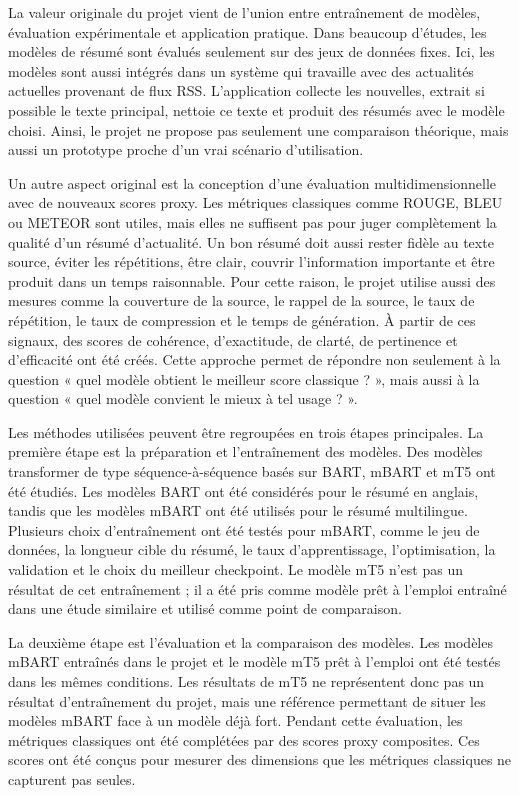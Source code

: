 La valeur originale du projet vient de l’union entre entraînement de modèles, évaluation expérimentale et application pratique. Dans beaucoup d’études, les modèles de résumé sont évalués seulement sur des jeux de données fixes. Ici, les modèles sont aussi intégrés dans un système qui travaille avec des actualités actuelles provenant de flux RSS. L’application collecte les nouvelles, extrait si possible le texte principal, nettoie ce texte et produit des résumés avec le modèle choisi. Ainsi, le projet ne propose pas seulement une comparaison théorique, mais aussi un prototype proche d’un vrai scénario d’utilisation.

Un autre aspect original est la conception d’une évaluation multidimensionnelle avec de nouveaux scores proxy. Les métriques classiques comme ROUGE, BLEU ou METEOR sont utiles, mais elles ne suffisent pas pour juger complètement la qualité d’un résumé d’actualité. Un bon résumé doit aussi rester fidèle au texte source, éviter les répétitions, être clair, couvrir l’information importante et être produit dans un temps raisonnable. Pour cette raison, le projet utilise aussi des mesures comme la couverture de la source, le rappel de la source, le taux de répétition, le taux de compression et le temps de génération. À partir de ces signaux, des scores de cohérence, d’exactitude, de clarté, de pertinence et d’efficacité ont été créés. Cette approche permet de répondre non seulement à la question « quel modèle obtient le meilleur score classique ? », mais aussi à la question « quel modèle convient le mieux à tel usage ? ».

Les méthodes utilisées peuvent être regroupées en trois étapes principales. La première étape est la préparation et l’entraînement des modèles. Des modèles transformer de type séquence-à-séquence basés sur BART, mBART et mT5 ont été étudiés. Les modèles BART ont été considérés pour le résumé en anglais, tandis que les modèles mBART ont été utilisés pour le résumé multilingue. Plusieurs choix d’entraînement ont été testés pour mBART, comme le jeu de données, la longueur cible du résumé, le taux d’apprentissage, l’optimisation, la validation et le choix du meilleur checkpoint. Le modèle mT5 n’est pas un résultat de cet entraînement ; il a été pris comme modèle prêt à l’emploi entraîné dans une étude similaire et utilisé comme point de comparaison.

La deuxième étape est l’évaluation et la comparaison des modèles. Les modèles mBART entraînés dans le projet et le modèle mT5 prêt à l’emploi ont été testés dans les mêmes conditions. Les résultats de mT5 ne représentent donc pas un résultat d’entraînement du projet, mais une référence permettant de situer les modèles mBART face à un modèle déjà fort. Pendant cette évaluation, les métriques classiques ont été complétées par des scores proxy composites. Ces scores ont été conçus pour mesurer des dimensions que les métriques classiques ne capturent pas seules.

